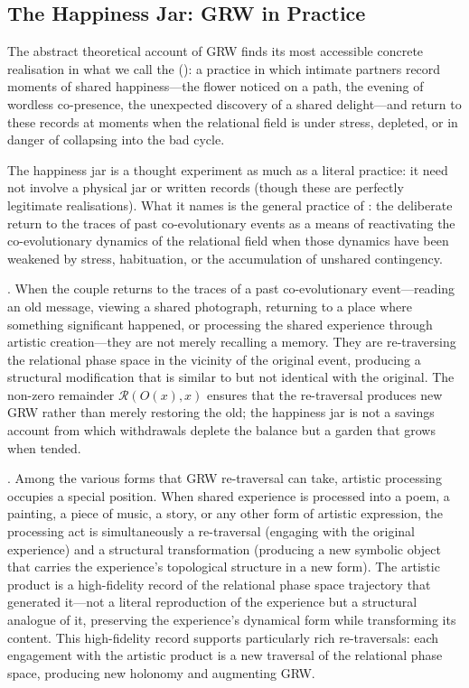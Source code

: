 \subsection{The Happiness Jar: GRW in Practice}
\label{p15:subsec:jar}

\noindent
The abstract theoretical account of GRW finds its most accessible concrete realisation in what we call the  (): a practice in which intimate partners record moments of shared happiness---the flower noticed on a path, the evening of wordless co-presence, the unexpected discovery of a shared delight---and return to these records at moments when the relational field is under stress, depleted, or in danger of collapsing into the bad cycle.

The happiness jar is a thought experiment as much as a literal practice: it need not involve a physical jar or written records (though these are perfectly legitimate realisations). What it names is the general practice of : the deliberate return to the traces of past co-evolutionary events as a means of reactivating the co-evolutionary dynamics of the relational field when those dynamics have been weakened by stress, habituation, or the accumulation of unshared contingency.

. When the couple returns to the traces of a past co-evolutionary event---reading an old message, viewing a shared photograph, returning to a place where something significant happened, or processing the shared experience through artistic creation---they are not merely recalling a memory. They are re-traversing the relational phase space in the vicinity of the original event, producing a structural modification that is similar to but not identical with the original. The non-zero remainder $\mathcal{R}(O(x), x)$ ensures that the re-traversal produces new GRW rather than merely restoring the old; the happiness jar is not a savings account from which withdrawals deplete the balance but a garden that grows when tended.

. Among the various forms that GRW re-traversal can take, artistic processing occupies a special position. When shared experience is processed into a poem, a painting, a piece of music, a story, or any other form of artistic expression, the processing act is simultaneously a re-traversal (engaging with the original experience) and a structural transformation (producing a new symbolic object that carries the experience's topological structure in a new form). The artistic product is a high-fidelity record of the relational phase space trajectory that generated it---not a literal reproduction of the experience but a structural analogue of it, preserving the experience's dynamical form while transforming its content. This high-fidelity record supports particularly rich re-traversals: each engagement with the artistic product is a new traversal of the relational phase space, producing new holonomy and augmenting GRW.

